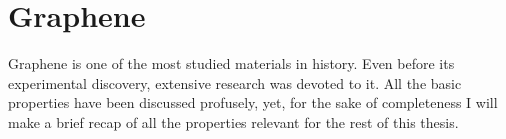 \chapter{Graphene}
\label{ch:graphene}

Graphene is one of the most studied materials in history\cite{KatsnelsonBook, Murakami2009, CastroNeto2009a,
Mas-Balleste2011, Rozhkov2016, Han2014, Konschuh2011a, Cooper2012, Sadurni2014}.
Even before its experimental discovery\cite{Novoselov2004, Novoselov2005},
extensive research was devoted to it\cite{Wallace1947, Oshima2000, Forbeaux1998, VanBommel1975, Semenoff1984, Haldane1988}.
All the basic properties have been discussed profusely\cite{Cooper2012, Geim2007}, yet, for the sake of completeness I will make a brief recap of all the properties relevant for the rest of this thesis.\\

